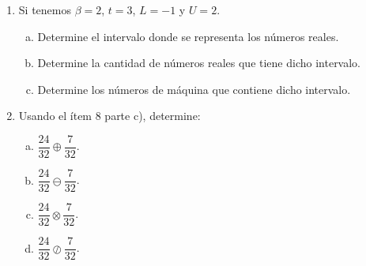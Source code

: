 \documentclass{beamer}
\newcounter{savedenum}
\newcommand*{\resume}{\setcounter{enumi}{\thesavedenum}}
\begin{document}
\begin{frame}
	\begin{enumerate}
		\resume
		\item Si tenemos $\beta=2$, $t=3$, $L=-1$ y $U=2$.
		      \begin{enumerate}[a)]
			      \item Determine el intervalo donde se representa los números reales.
			      \item Determine la cantidad de números reales que tiene dicho intervalo.
			      \item Determine los números de máquina que contiene dicho intervalo.
		      \end{enumerate}
		\item Usando el ítem 8 parte c), determine:
		      \begin{multicols}{4}
			      \begin{enumerate}[a)]
				      \item $\dfrac{24}{32}\oplus\dfrac{7}{32}$.
				      \item $\dfrac{24}{32}\ominus\dfrac{7}{32}$.
				      \item $\dfrac{24}{32}\otimes\dfrac{7}{32}$.
				      \item $\dfrac{24}{32}\oslash\dfrac{7}{32}$.
			      \end{enumerate}
		      \end{multicols}
	\end{enumerate}
\end{frame}
\end{document}
